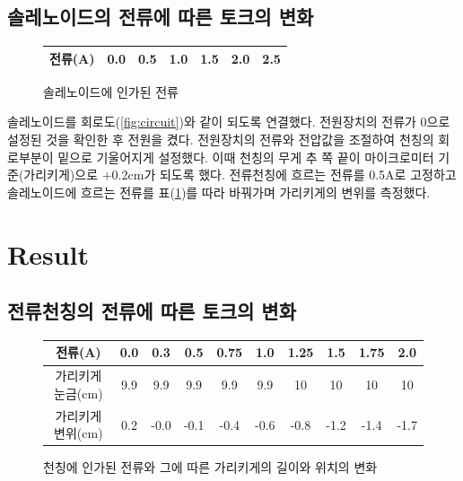 \documentclass[a4paper]{article}
\begin{document}
		\subsection{솔레노이드의 전류에 따른 토크의 변화}

		\begin{figure}
			\centering
            \vspace{-0.5 cm}
			\begin{tabular}{ccccccc} 
				\hline \hline
				전류(A) \vline & 0.0 & 0.5 & 1.0 & 1.5 & 2.0 & 2.5 \\
				\hline \hline
			\end{tabular}  \vspace{-0.2cm} \caption{솔레노이드에 인가된 전류}
			\vspace{-0.5cm}
			\label{tb:solinput}
		\end{figure}
		솔레노이드를 회로도(\ref{fig:circuit})와 같이 되도록 연결했다. 
		전원장치의 전류가 0으로 설정된 것을 확인한 후 전원을 켰다.
		전원장치의 전류와 전압값을 조절하여 천칭의 회로부분이 밑으로 기울어지게 설정했다.
		이때 천칭의 무게 추 쪽 끝이 마이크로미터 기준(가리키게)으로 +0.2\si{cm}가 되도록 했다.
		전류천칭에 흐르는 전류를 0.5\si{A}로 고정하고 솔레노이드에 흐르는 전류를 표(\ref{tb:solinput})를 따라 바꿔가며 가리키게의 변위를 측정했다.
	
	\section{Result}
		\subsection{전류천칭의 전류에 따른 토크의 변화}
		\begin{figure}[h]
			\centering
          
			\begin{tabular}{cccccccccc} 
				\hline \hline
				전류(\si{A})   \qquad \qquad \vline & 0.0 & 0.3 & 0.5 & 0.75 & 1.0 & 1.25 & 1.5 & 1.75 & 2.0 \\
				\hline
				가리키게 눈금(\si{cm}) \vline & 9.9 & 9.9 & 9.9 & 9.9 & 9.9 & 10 & 10 & 10 & 10 \\
				\hline
				가리키게 변위(\si{cm}) \vline & 0.2 & -0.0 & -0.1 & -0.4 & -0.6 & -0.8 & -1.2 & -1.4 & -1.7 \\
				\hline \hline
			\end{tabular}  \vspace{-0.2cm} \caption{천칭에 인가된 전류와 그에 따른 가리키게의 길이와 위치의 변화}
			\vspace{-0.5cm}
			\label{tb:cirouput}
		\end{figure}
		
\end{document}

